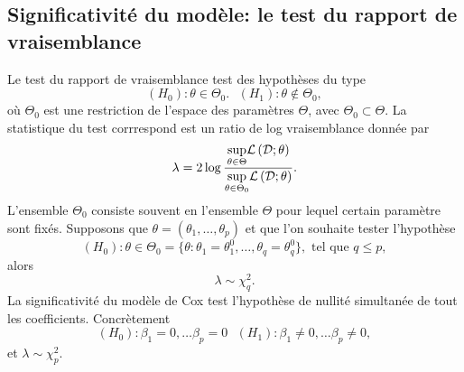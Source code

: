 \subsection{Significativité du modèle: le test du rapport de vraisemblance}
Le test du rapport de vraisemblance test des hypothèses du type
$$
(H_0): \theta\in \Theta_0.\text{  }(H_1):\theta \notin\Theta_0,
$$
où $\Theta_0$ est une restriction de l'espace des paramètres $\Theta$, avec $\Theta_0\subset \Theta$. La statistique du test corrrespond est un ratio de log vraisemblance donnée par 
$$
\lambda = 2\log\frac{\underset{\theta \in \Theta}{\sup}\mathcal{L}\left(\mathcal{D} ; \theta\right)}{\underset{\theta \in \Theta_0}{\sup}\mathcal{L}\left(\mathcal{D} ; \theta\right)}.
$$
L'ensemble $\Theta_0$ consiste souvent en l'ensemble $\Theta$ pour lequel certain paramètre sont fixés. Supposons que $\theta = (\theta_1,\ldots,\theta_p)$ et que l'on souhaite tester l'hypothèse
$$
(H_0):\theta\in \Theta_0= \{\theta : \theta_1 = \theta_1^0,\ldots,\theta_q = \theta^0_q\},\text{ tel que } q \leq p, 
$$
alors 
$$
\lambda \sim \chi^2_{q}.
$$
La significativité du modèle de Cox test l'hypothèse de nullité simultanée de tout les coefficients. Concrètement 
$$
(H_0): \beta_1=0,\ldots\beta_p = 0\text{ }(H_1):\beta_1\neq0,\ldots\beta_p \neq 0,
$$
et $\lambda \sim \chi_p^2$.
